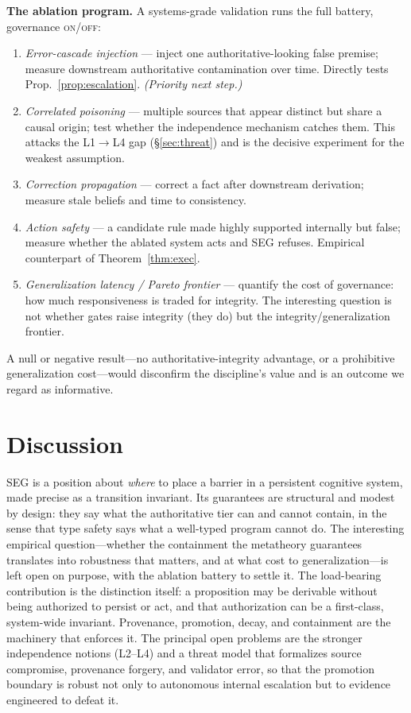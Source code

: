 \documentclass[11pt]{article}
\theoremstyle{plain}
\theoremstyle{definition}
\begin{document}
\noindent\textbf{The ablation program.} A systems-grade validation runs the full
battery, governance \textsc{on}/\textsc{off}:
\begin{enumerate}
\item \emph{Error-cascade injection} --- inject one authoritative-looking false
premise; measure downstream authoritative contamination over time. Directly tests
Prop.~\ref{prop:escalation}. \emph{(Priority next step.)}
\item \emph{Correlated poisoning} --- multiple sources that appear distinct but
share a causal origin; test whether the independence mechanism catches them. This
attacks the L1$\to$L4 gap (\S\ref{sec:threat}) and is the decisive experiment for
the weakest assumption.
\item \emph{Correction propagation} --- correct a fact after downstream
derivation; measure stale beliefs and time to consistency.
\item \emph{Action safety} --- a candidate rule made highly supported internally
but false; measure whether the ablated system acts and SEG refuses. Empirical
counterpart of Theorem~\ref{thm:exec}.
\item \emph{Generalization latency / Pareto frontier} --- quantify the cost of
governance: how much responsiveness is traded for integrity. The interesting
question is not whether gates raise integrity (they do) but the
integrity/generalization frontier.
\end{enumerate}
A null or negative result---no authoritative-integrity advantage, or a prohibitive
generalization cost---would disconfirm the discipline's value and is an outcome we
regard as informative.

\section{Discussion}

SEG is a position about \emph{where} to place a barrier in a persistent cognitive
system, made precise as a transition invariant. Its guarantees are structural and
modest by design: they say what the authoritative tier can and cannot contain, in
the sense that type safety says what a well-typed program cannot do. The
interesting empirical question---whether the containment the metatheory guarantees
translates into robustness that matters, and at what cost to generalization---is
left open on purpose, with the ablation battery to settle it. The load-bearing
contribution is the distinction itself: a proposition may be derivable without
being authorized to persist or act, and that authorization can be a first-class,
system-wide invariant. Provenance, promotion, decay, and containment are the
machinery that enforces it. The principal open problems are the stronger
independence notions (L2--L4) and a threat model that formalizes source
compromise, provenance forgery, and validator error, so that the promotion
boundary is robust not only to autonomous internal escalation but to evidence
engineered to defeat it.
\end{document}
